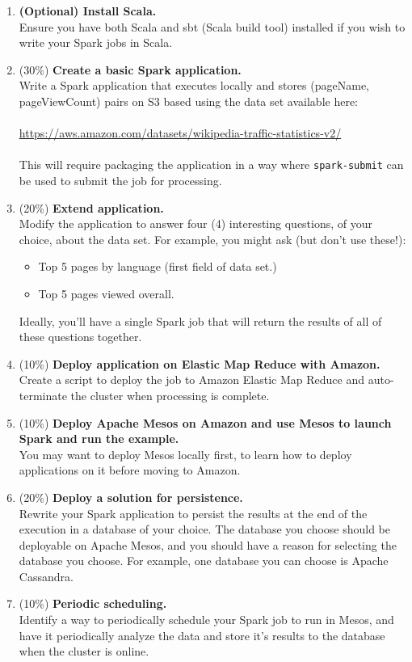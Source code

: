 \documentclass[]{article}
\begin{document}
\begin{enumerate}
\item \textbf{(Optional) Install Scala.} 
	\\ Ensure you have both Scala and sbt (Scala build tool) installed if you wish to write your Spark jobs in Scala.
\item (30\%) \textbf{Create a basic Spark application.}
	\\ Write a Spark application that executes locally and stores  (pageName, pageViewCount) pairs on S3 based using the data set available here: \\
	\\ \url{https://aws.amazon.com/datasets/wikipedia-traffic-statistics-v2/}	
	\\ \\ This will require packaging the application in a way where \texttt{spark-submit} can be used to submit the job for processing.
\item (20\%) \textbf{Extend application.}
	\\ Modify the application to answer four (4) interesting questions, of your choice, about the data set.  For example, you might ask (but don't use these!): \begin{itemize}
 	\item Top 5 pages by language (first field of data set.)
 	\item Top 5 pages viewed overall.
 \end{itemize}
 Ideally, you'll have a single Spark job that will return the results of all of these questions together.
 
\item (10\%) \textbf{Deploy application on Elastic Map Reduce with Amazon.} 
	\\ Create a script to deploy the job to Amazon Elastic Map Reduce and auto-terminate the cluster when processing is complete.

\item (10\%) \textbf{Deploy Apache Mesos on Amazon and use Mesos to launch Spark and run the example.}
	\\ You may want to deploy Mesos locally first, to learn how to deploy applications on it before moving to Amazon.

\item (20\%) \textbf{Deploy a solution for persistence.}
	\\ Rewrite your Spark application to persist the results at the end of the execution in a database of your choice.  The database you choose should be deployable on Apache Mesos, and you should have a reason for selecting the database you choose.  For example, one database you can choose is Apache Cassandra.
	
\item (10\%) \textbf{Periodic scheduling.}
	\\ Identify a way to periodically schedule your Spark job to run in Mesos, and have it periodically analyze the data and store it's results to the database when the cluster is online.

\end{enumerate}
\end{document}
